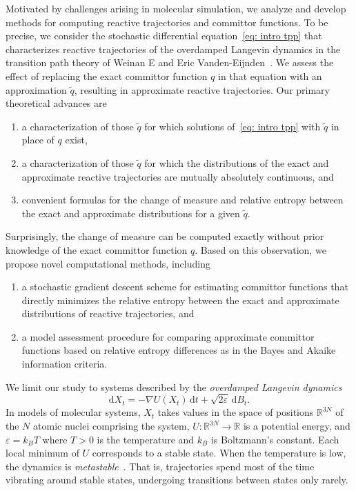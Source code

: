 \documentclass[reqno]{amsart}
\newcommand{\Real}{\mathbb{R}}
\newcommand{\eps}{\varepsilon}
\newcommand{\1}{\mathds{1}}
\renewcommand{\d}{\mathrm{d}}
\newcommand{\grad}{\nabla}
\theoremstyle{definition}
\theoremstyle{remark}
\begin{document}
 Motivated by challenges arising in molecular simulation, we analyze and develop methods for computing reactive trajectories and committor functions. To be precise, we consider the stochastic differential equation~\eqref{eq: intro tpp} that characterizes reactive trajectories of the overdamped Langevin dynamics in the transition path theory of Weinan E and Eric Vanden-Eijnden~\cite{e_towards_2006}. We assess the effect of replacing the exact committor function $q$ in that equation with an approximation $\tilde q$, resulting in approximate reactive trajectories. Our primary theoretical advances are
  \begin{enumerate}
  \item a characterization of those $\tilde q$ for which solutions of~\eqref{eq: intro tpp} with $\tilde q$ in place of $q$ exist,
  \item a characterization of those $\tilde q$ for which the distributions of the exact and approximate reactive trajectories are mutually absolutely continuous, and 
  \item convenient formulas for the change of measure and relative entropy between the exact and approximate distributions for a given $\tilde q$.
  \end{enumerate}
  Surprisingly, the change of measure can be computed exactly without prior knowledge of the exact committor function $q$. Based on this observation, we propose novel computational methods, including
  \begin{enumerate}
  \item a stochastic gradient descent scheme for estimating committor functions that directly minimizes the relative entropy between the exact and approximate distributions of reactive trajectories, and
  \item a model assessment procedure for comparing approximate committor functions based on relative entropy differences as in the Bayes and Akaike information criteria.  
  \end{enumerate}
  
We limit our study to systems described by the \emph{overdamped Langevin dynamics}
\begin{equation}\label{eq: intro overdamped Langevin}
\d X_t = - \grad U (X_t) \, \d t + \sqrt{2 \eps} \,  \d B_t.
\end{equation}
In models of molecular systems, $X_t$ takes values in the space of positions $\Real^{3N}$ of the $N$ atomic nuclei comprising the system, $U: \Real^{3N} \rightarrow \Real$ is a potential energy, and $\eps = k_B T$ where $T>0$ is the temperature and $k_B$ is Boltzmann's constant. Each local minimum of $U$ corresponds to a stable state. When the temperature is low, the dynamics is \emph{metastable}~\cite{gayrard_metastability_2004}. That is, trajectories spend most of the time vibrating around stable states, undergoing transitions between states only rarely. 
\end{document}
